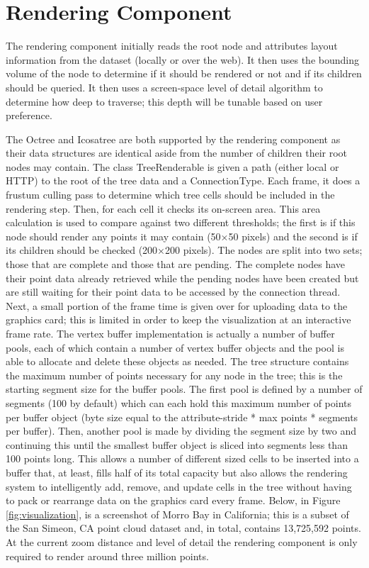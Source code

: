 \section{Rendering Component}

The rendering component initially reads the root node and attributes layout
information from the dataset (locally or over the web). It then uses the
bounding volume of the node to determine if it should be rendered or not and if
its children should be queried. It then uses a screen-space level of detail
algorithm to determine how deep to traverse; this depth will be tunable based on
user preference.

The Octree and Icosatree are both supported by the rendering component as their
data structures are identical aside from the number of children their root nodes
may contain. The class TreeRenderable is given a path (either local or HTTP) to
the root of the tree data and a ConnectionType.  Each frame, it does a frustum
culling pass to determine which tree cells should be included in the rendering
step. Then, for each cell it checks its on-screen area. This area calculation is
used to compare against two different thresholds; the first is if this node
should render any points it may contain (50×50 pixels) and the second is if its
children should be checked (200×200 pixels). The nodes are split into two sets;
those that are complete and those that are pending. The complete nodes have
their point data already retrieved while the pending nodes have been created but
are still waiting for their point data to be accessed by the connection thread.
Next, a small portion of the frame time is given over for uploading data to the
graphics card; this is limited in order to keep the visualization at an
interactive frame rate. The vertex buffer implementation is actually a number of
buffer pools, each of which contain a number of vertex buffer objects and the
pool is able to allocate and delete these objects as needed. The tree structure
contains the maximum number of points necessary for any node in the tree; this
is the starting segment size for the buffer pools. The first pool is defined by
a number of segments (100 by default) which can each hold this maximum number of
points per buffer object (byte size equal to the attribute-stride * max points *
segments per buffer). Then, another pool is made by dividing the segment size by
two and continuing this until the smallest buffer object is sliced into segments
less than 100 points long. This allows a number of different sized cells to be
inserted into a buffer that, at least, fills half of its total capacity but also
allows the rendering system to intelligently add, remove, and update cells in
the tree without having to pack or rearrange data on the graphics card every
frame. Below, in Figure \ref{fig:visualization}, is a screenshot of Morro Bay in
California; this is a subset of the San Simeon, CA point cloud dataset and, in total, contains
13,725,592 points. At the current zoom distance and level of detail the
rendering component is only required to render around three million points.

